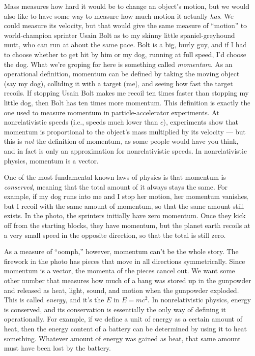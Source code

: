 Mass measures how hard it would be to change an object's motion, but we would also
like to have some way to measure how much motion it actually \emph{has}.
We could measure its velocity, but that would give the same measure of ``motion''
to world-champion sprinter Usain Bolt as to my skinny little spaniel-greyhound
mutt, who can run at about the same pace. Bolt is a big, burly guy, and if I had
to choose whether to get hit by him or my dog, running at full speed, I'd choose
the dog. What we're groping for here is something called \emph{momentum}. As an operational
definition, momentum can be defined by taking the moving object (say my dog), colliding
it with a target (me), and seeing how fast the target recoils. If stopping Usain Bolt
makes me recoil ten times faster than stopping my little dog, then Bolt has ten times
more momentum. This definition is exactly the one used to measure momentum in particle-accelerator
experiments. At nonrelativistic speeds (i.e., speeds much lower than $c$), experiments show
that momentum is proportional to the object's mass multiplied by its velocity --- but this is
\emph{not} the definition of momentum, as some people would have you think, and in fact is
only an approximation for nonrelativistic speeds.
In nonrelativistic physics, momentum is a vector. 

One of the most fundamental known laws of physics
is that momentum is \emph{conserved}, meaning that the total amount of it always stays the same.
For example, if my dog runs into me and I stop her motion, her momentum vanishes, but I recoil
with the same amount of momentum, so that the same amount still exists. In the photo, the sprinters
initially have zero momentum. Once they kick off from the starting blocks, they have momentum, but
the planet earth recoils at a very small speed in the opposite direction, so that the total is
still zero.


As a measure of ``oomph,'' however, momentum can't be the whole story. The firework in
the photo has pieces that move in all directions symmetrically. Since momentum is a vector,
the momenta of the pieces cancel out. We want some other number that measures how much of a
bang was stored up in the gunpowder and released as heat, light, sound, and motion when the gunpowder exploded.
This is called \emph{energy}, and it's the $E$ in $E=mc^2$. In nonrelativistic physics, energy is
conserved, and its conservation is essentially the only way of defining it operationally.
For example, if we define a unit of energy as a certain amount of heat, then the energy content of
a battery can be determined by using it to heat something. Whatever amount of energy was gained as heat,
that same amount must have been lost by the battery.

